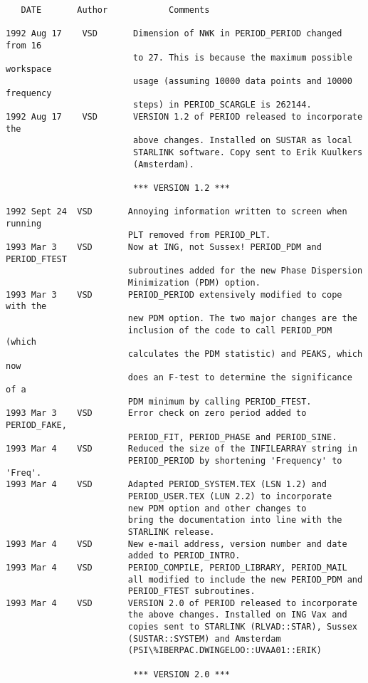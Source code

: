 \newpage


\begin{verbatim}
   DATE       Author            Comments

1992 Aug 17    VSD       Dimension of NWK in PERIOD_PERIOD changed from 16
                         to 27. This is because the maximum possible workspace
                         usage (assuming 10000 data points and 10000 frequency
                         steps) in PERIOD_SCARGLE is 262144.
1992 Aug 17    VSD       VERSION 1.2 of PERIOD released to incorporate the
                         above changes. Installed on SUSTAR as local
                         STARLINK software. Copy sent to Erik Kuulkers
                         (Amsterdam).

                         *** VERSION 1.2 ***

1992 Sept 24  VSD       Annoying information written to screen when running
                        PLT removed from PERIOD_PLT.
1993 Mar 3    VSD       Now at ING, not Sussex! PERIOD_PDM and PERIOD_FTEST
                        subroutines added for the new Phase Dispersion
                        Minimization (PDM) option.
1993 Mar 3    VSD       PERIOD_PERIOD extensively modified to cope with the
                        new PDM option. The two major changes are the
                        inclusion of the code to call PERIOD_PDM (which
                        calculates the PDM statistic) and PEAKS, which now
                        does an F-test to determine the significance of a
                        PDM minimum by calling PERIOD_FTEST.
1993 Mar 3    VSD       Error check on zero period added to PERIOD_FAKE,
                        PERIOD_FIT, PERIOD_PHASE and PERIOD_SINE.
1993 Mar 4    VSD       Reduced the size of the INFILEARRAY string in
                        PERIOD_PERIOD by shortening 'Frequency' to 'Freq'.
1993 Mar 4    VSD       Adapted PERIOD_SYSTEM.TEX (LSN 1.2) and
                        PERIOD_USER.TEX (LUN 2.2) to incorporate
                        new PDM option and other changes to
                        bring the documentation into line with the
                        STARLINK release.
1993 Mar 4    VSD       New e-mail address, version number and date
                        added to PERIOD_INTRO.
1993 Mar 4    VSD       PERIOD_COMPILE, PERIOD_LIBRARY, PERIOD_MAIL
                        all modified to include the new PERIOD_PDM and
                        PERIOD_FTEST subroutines.
1993 Mar 4    VSD       VERSION 2.0 of PERIOD released to incorporate
                        the above changes. Installed on ING Vax and
                        copies sent to STARLINK (RLVAD::STAR), Sussex
                        (SUSTAR::SYSTEM) and Amsterdam
                        (PSI\%IBERPAC.DWINGELOO::UVAA01::ERIK)

                         *** VERSION 2.0 ***

\end{verbatim}


